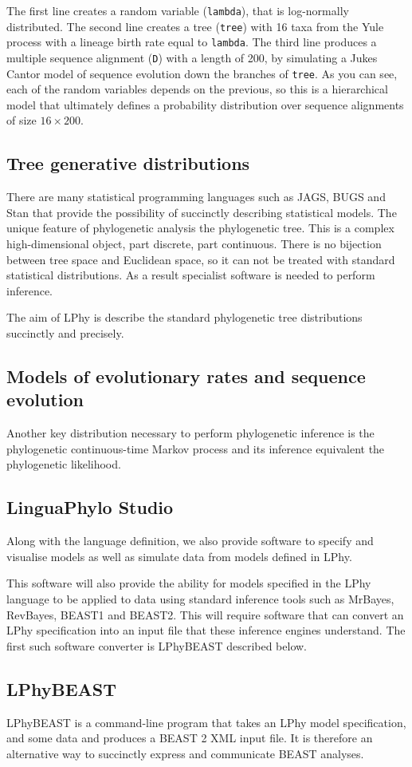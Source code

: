 \documentclass[11pt]{article}
\begin{document}
The first line creates a random variable (\texttt{lambda}), that is log-normally distributed. The second line creates a tree (\texttt{tree}) with 16 taxa from the Yule process with a lineage birth rate equal to \texttt{lambda}. The third line produces a multiple sequence alignment (\texttt{D}) with a length of 200, by simulating a Jukes Cantor model of sequence evolution down the branches of  \texttt{tree}. As you can see, each of the random variables depends on the previous, so this is a hierarchical model that ultimately defines a probability distribution over sequence alignments of size $16 \times 200$.

\subsection{Tree generative distributions}

There are many statistical programming languages such as JAGS, BUGS and Stan that provide the possibility of succinctly describing statistical models. The unique feature of phylogenetic analysis the phylogenetic tree. This is a complex high-dimensional object, part discrete, part continuous. There is no bijection between tree space and Euclidean space, so it can not be treated with standard statistical distributions. As a result specialist software is needed to perform inference.

The aim of LPhy is describe the standard phylogenetic tree distributions succinctly and precisely. 

\subsection{Models of evolutionary rates and sequence evolution}

Another key distribution necessary to perform phylogenetic inference is the phylogenetic continuous-time Markov process and its inference equivalent the phylogenetic likelihood. 




\subsection{LinguaPhylo Studio}

Along with the language definition, we also provide software to specify and visualise models as well as simulate data from models defined in LPhy. 

This software will also provide the ability for models specified in the LPhy language to be applied to data using standard inference tools such as MrBayes, RevBayes, BEAST1 and BEAST2. This will require software that can convert an LPhy specification into an input file that these inference engines understand. The first such software converter is LPhyBEAST described below.

\subsection{LPhyBEAST}

LPhyBEAST is a command-line program that takes an LPhy model specification, and some data and produces a BEAST 2 XML input file.
It is therefore an alternative way to succinctly express and communicate BEAST analyses.
\end{document}

